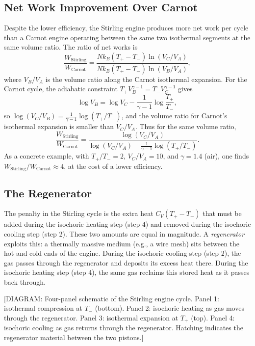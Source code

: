 \subsection{Net Work Improvement Over Carnot}

Despite the lower efficiency, the Stirling engine produces more net work per cycle than a Carnot engine operating between the same two isothermal segments at the same volume ratio. The ratio of net works is
\begin{equation}
    \frac{W_{\text{Stirling}}}{W_{\text{Carnot}}} = \frac{Nk_B(T_+-T_-)\ln(V_C/V_A)}{Nk_B(T_+-T_-)\ln(V_B/V_A)},
\end{equation}
where $V_B/V_A$ is the volume ratio along the Carnot isothermal expansion. For the Carnot cycle, the adiabatic constraint $T_+ V_B^{\gamma-1} = T_- V_C^{\gamma-1}$ gives
\begin{equation}
    \log V_B = \log V_C - \frac{1}{\gamma-1}\log\frac{T_+}{T_-},
\end{equation}
so $\log(V_C/V_B) = \frac{1}{\gamma-1}\log(T_+/T_-)$, and the volume ratio for Carnot's isothermal expansion is smaller than $V_C/V_A$. Thus for the same volume ratio,
\begin{equation}
    \frac{W_{\text{Stirling}}}{W_{\text{Carnot}}} = \frac{\log(V_C/V_A)}{\log(V_C/V_A) - \frac{1}{\gamma-1}\log(T_+/T_-)}.
\end{equation}
As a concrete example, with $T_+/T_- = 2$, $V_C/V_A = 10$, and $\gamma = 1.4$ (air), one finds $W_{\text{Stirling}}/W_{\text{Carnot}} \approx 4$, at the cost of a lower efficiency.

\subsection{The Regenerator}

The penalty in the Stirling cycle is the extra heat $C_V(T_+ - T_-)$ that must be added during the isochoric heating step (step 4) and removed during the isochoric cooling step (step 2). These two amounts are equal in magnitude. A \emph{regenerator} exploits this: a thermally massive medium (e.g., a wire mesh) sits between the hot and cold ends of the engine. During the isochoric cooling step (step 2), the gas passes through the regenerator and deposits its excess heat there. During the isochoric heating step (step 4), the same gas reclaims this stored heat as it passes back through.

\begin{center}[DIAGRAM: Four-panel schematic of the Stirling engine cycle. Panel 1: isothermal compression at $T_-$ (bottom). Panel 2: isochoric heating as gas moves through the regenerator. Panel 3: isothermal expansion at $T_+$ (top). Panel 4: isochoric cooling as gas returns through the regenerator. Hatching indicates the regenerator material between the two pistons.]\end{center}

